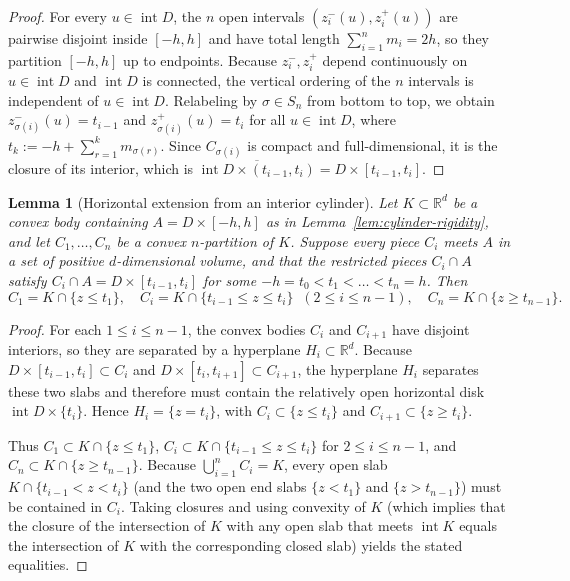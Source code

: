 \documentclass[11pt,a4paper]{amsart}
\numberwithin{equation}{section}
\newtheorem{lemma}[theorem]{Lemma}
\theoremstyle{definition}
\newcommand{\R}{\mathbb{R}}
\newcommand{\inte}{\operatorname{int}}
\begin{document}
\begin{proof}
For every $u \in \inte D$, the $n$ open intervals $(z_i^-(u), z_i^+(u))$ are pairwise disjoint inside $[-h, h]$ and have total length $\sum_{i=1}^n m_i = 2h$, so they partition $[-h, h]$ up to endpoints. Because $z_i^-, z_i^+$ depend continuously on $u \in \inte D$ and $\inte D$ is connected, the vertical ordering of the $n$ intervals is independent of $u \in \inte D$. Relabeling by $\sigma \in S_n$ from bottom to top, we obtain $z_{\sigma(i)}^-(u) = t_{i-1}$ and $z_{\sigma(i)}^+(u) = t_i$ for all $u \in \inte D$, where $t_k := -h + \sum_{r=1}^k m_{\sigma(r)}$. Since $C_{\sigma(i)}$ is compact and full-dimensional, it is the closure of its interior, which is $\overline{\inte D \times (t_{i-1}, t_i)} = D \times [t_{i-1}, t_i]$.
\end{proof}

\begin{lemma}[Horizontal extension from an interior cylinder]
\label{lem:horizontal-extension}
Let $K \subset \R^d$ be a convex body containing $A = D \times [-h, h]$ as in Lemma~\ref{lem:cylinder-rigidity}, and let $C_1, \dots, C_n$ be a convex $n$-partition of $K$. Suppose every piece $C_i$ meets $A$ in a set of positive $d$-dimensional volume, and that the restricted pieces $C_i \cap A$ satisfy $C_i \cap A = D \times [t_{i-1}, t_i]$ for some $-h = t_0 < t_1 < \dots < t_n = h$. Then
\[
C_1 = K \cap \{z \le t_1\}, \quad C_i = K \cap \{t_{i-1} \le z \le t_i\} \;\; (2 \le i \le n-1), \quad C_n = K \cap \{z \ge t_{n-1}\}.
\]
\end{lemma}

\begin{proof}
For each $1 \le i \le n-1$, the convex bodies $C_i$ and $C_{i+1}$ have disjoint interiors, so they are separated by a hyperplane $H_i \subset \R^d$. Because $D \times [t_{i-1}, t_i] \subset C_i$ and $D \times [t_i, t_{i+1}] \subset C_{i+1}$, the hyperplane $H_i$ separates these two slabs and therefore must contain the relatively open horizontal disk $\inte D \times \{t_i\}$. Hence $H_i = \{z = t_i\}$, with $C_i \subset \{z \le t_i\}$ and $C_{i+1} \subset \{z \ge t_i\}$.

Thus $C_1 \subset K \cap \{z \le t_1\}$, $C_i \subset K \cap \{t_{i-1} \le z \le t_i\}$ for $2 \le i \le n-1$, and $C_n \subset K \cap \{z \ge t_{n-1}\}$. Because $\bigcup_{i=1}^n C_i = K$, every open slab $K \cap \{t_{i-1} < z < t_i\}$ (and the two open end slabs $\{z < t_1\}$ and $\{z > t_{n-1}\}$) must be contained in $C_i$. Taking closures and using convexity of $K$ (which implies that the closure of the intersection of $K$ with any open slab that meets $\inte K$ equals the intersection of $K$ with the corresponding closed slab) yields the stated equalities.
\end{proof}
\end{document}
